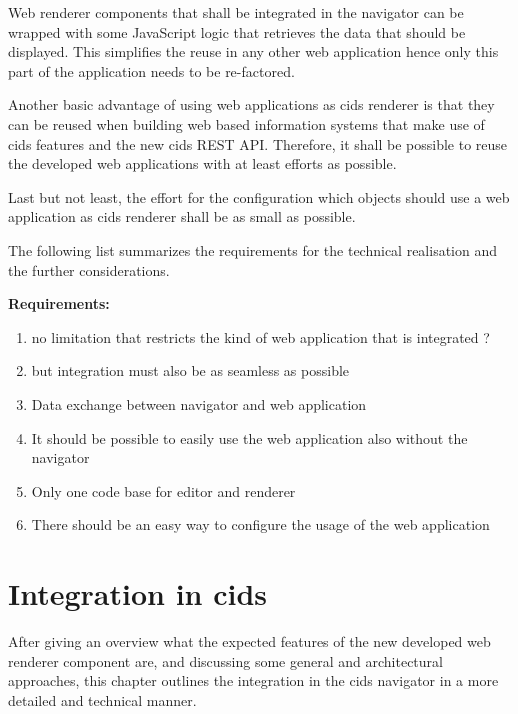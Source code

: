Web renderer components that shall be integrated in the navigator can be wrapped with some JavaScript logic that retrieves the data that should be displayed.
This simplifies the reuse in any other web application hence only this part of the application needs to be re-factored.
	
Another basic advantage of using web applications as cids renderer is that they can be reused when building web based information systems that make use of cids features and the new cids REST API. 
Therefore, it shall be possible to reuse the developed web applications with at least efforts as possible.

Last but not least, the effort for the configuration which objects should use a web application as cids renderer shall be as small as possible.

The following list summarizes the requirements for the technical realisation and the further considerations.

\textbf{Requirements:} 
\begin{enumerate}
\item no limitation that restricts the kind of web application that is integrated ? 
\item but integration must also be as seamless as possible 
\item Data exchange between navigator and web application
\item It should be possible to easily use the web application also without the navigator
\item Only one code base for editor and renderer
\item There should be an easy way to configure the usage of the web application
\end{enumerate} 


\section{Integration in cids}

After giving an overview what the expected features of the new developed  web renderer component are, and discussing some general and architectural approaches, this chapter outlines the integration in the cids navigator in a more detailed and technical manner.

